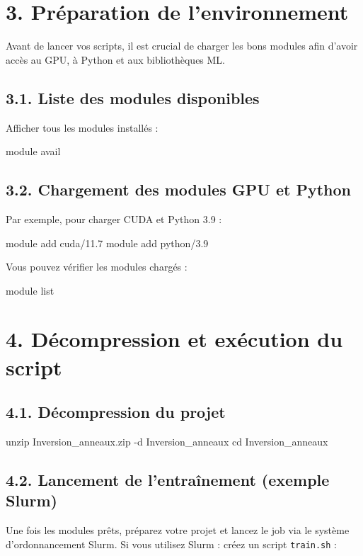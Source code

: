 \documentclass[a4paper,12pt]{article}
\begin{document}
\section{3. Préparation de l’environnement}
Avant de lancer vos scripts, il est crucial de charger les bons modules afin d’avoir accès au GPU, à Python et aux bibliothèques ML.

\subsection{3.1. Liste des modules disponibles}
Afficher tous les modules installés :
\begin{terminal}
module avail
\end{terminal}

\subsection{3.2. Chargement des modules GPU et Python}
Par exemple, pour charger CUDA et Python 3.9 :
\begin{terminal}
module add cuda/11.7
module add python/3.9
\end{terminal}

Vous pouvez vérifier les modules chargés :
\begin{terminal}
module list
\end{terminal}

\section{4. Décompression et exécution du script}

\subsection{4.1. Décompression du projet}
\begin{terminal}[Décompression]
unzip Inversion\_anneaux.zip -d Inversion\_anneaux
cd Inversion\_anneaux
\end{terminal}

\subsection{4.2. Lancement de l’entraînement (exemple Slurm)}
Une fois les modules prêts, préparez votre projet et lancez le job via le système d’ordonnancement Slurm.
Si vous utilisez Slurm : créez un script \texttt{train.sh} :
\end{document}
